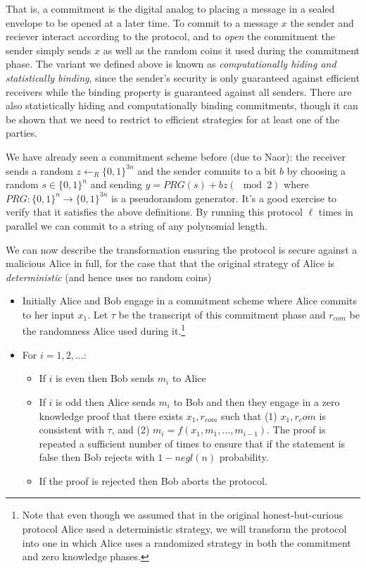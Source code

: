 That is, a commitment is the digital analog to placing a message in a
sealed envelope to be opened at a later time. To commit to a message
\(x\) the sender and reciever interact according to the protocol, and to
\emph{open} the commitment the sender simply sends \(x\) as well as the
random coins it used during the commitment phase. The variant we defined
above is known as \emph{computationally hiding and statistically
binding}, since the sender's security is only guaranteed against
efficient receivers while the binding property is guaranteed against all
senders. There are also statistically hiding and computationally binding
commitments, though it can be shown that we need to restrict to
efficient strategies for at least one of the parties.

We have already seen a commitment scheme before (due to Naor): the
receiver sends a random \(z\leftarrow_R\{0,1\}^{3n}\) and the sender
commits to a bit \(b\) by choosing a random \(s\in\{0,1\}^n\) and
sending \(y = \ensuremath{\mathit{PRG}}(s)+ bz (\mod 2)\) where
\(\ensuremath{\mathit{PRG}}:\{0,1\}^n\rightarrow\{0,1\}^{3n}\) is a
pseudorandom generator. It's a good exercise to verify that it satisfies
the above definitions. By running this protocol \(\ell\) times in
parallel we can commit to a string of any polynomial length.

We can now describe the transformation ensuring the protocol is secure
against a malicious Alice in full, for the case that that the original
strategy of Alice is \emph{deterministic} (and hence uses no random
coins)

\begin{itemize}
\item
  Initially Alice and Bob engage in a commitment scheme where Alice
  commits to her input \(x_1\). Let \(\tau\) be the transcript of this
  commitment phase and \(r_{com}\) be the randomness Alice used during
  it.\footnote{Note that even though we assumed that in the original
    honest-but-curious protocol Alice used a deterministic strategy, we
    will transform the protocol into one in which Alice uses a
    randomized strategy in both the commitment and zero knowledge
    phases.}
\item
  For \(i=1,2,\ldots\):

  \begin{itemize}
  \item
    If \(i\) is even then Bob sends \(m_i\) to Alice
  \item
    If \(i\) is odd then Alice sends \(m_i\) to Bob and then they engage
    in a zero knowledge proof that there exists \(x_1,r_{com}\) such
    that (1) \(x_1,r_com\) is consistent with \(\tau\), and (2)
    \(m_i = f(x_1,m_1,\ldots,m_{i-1})\). The proof is repeated a
    sufficient number of times to ensure that if the statement is false
    then Bob rejects with \(1-negl(n)\) probability.
  \item
    If the proof is rejected then Bob aborts the protocol.
  \end{itemize}
\end{itemize}

